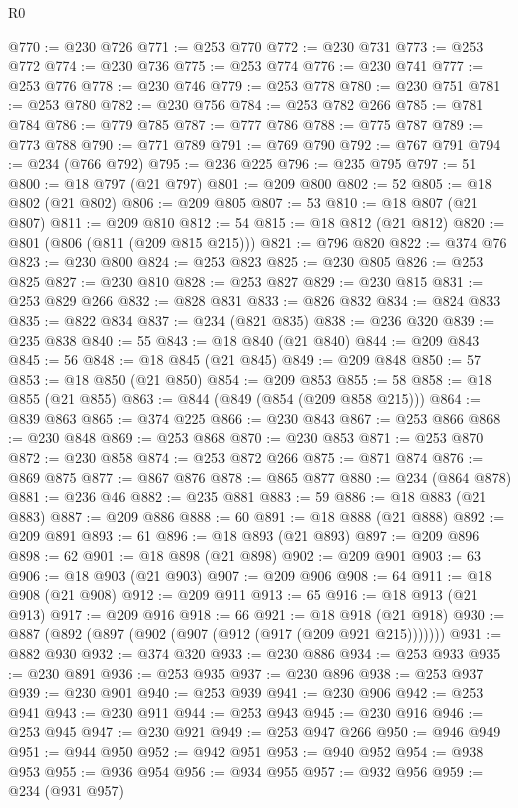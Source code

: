 \begin{lexlean}{R0}
\begin{coremodule}
@770 := @230 @726
@771 := @253 @770
@772 := @230 @731
@773 := @253 @772
@774 := @230 @736
@775 := @253 @774
@776 := @230 @741
@777 := @253 @776
@778 := @230 @746
@779 := @253 @778
@780 := @230 @751
@781 := @253 @780
@782 := @230 @756
@784 := @253 @782 @266
@785 := @781 @784
@786 := @779 @785
@787 := @777 @786
@788 := @775 @787
@789 := @773 @788
@790 := @771 @789
@791 := @769 @790
@792 := @767 @791
@794 := @234 (@766 @792)
@795 := @236 @225
@796 := @235 @795
@797 := 51
@800 := @18 @797 (@21 @797)
@801 := @209 @800
@802 := 52
@805 := @18 @802 (@21 @802)
@806 := @209 @805
@807 := 53
@810 := @18 @807 (@21 @807)
@811 := @209 @810
@812 := 54
@815 := @18 @812 (@21 @812)
@820 := @801 (@806 (@811 (@209 @815 @215)))
@821 := @796 @820
@822 := @374 @76
@823 := @230 @800
@824 := @253 @823
@825 := @230 @805
@826 := @253 @825
@827 := @230 @810
@828 := @253 @827
@829 := @230 @815
@831 := @253 @829 @266
@832 := @828 @831
@833 := @826 @832
@834 := @824 @833
@835 := @822 @834
@837 := @234 (@821 @835)
@838 := @236 @320
@839 := @235 @838
@840 := 55
@843 := @18 @840 (@21 @840)
@844 := @209 @843
@845 := 56
@848 := @18 @845 (@21 @845)
@849 := @209 @848
@850 := 57
@853 := @18 @850 (@21 @850)
@854 := @209 @853
@855 := 58
@858 := @18 @855 (@21 @855)
@863 := @844 (@849 (@854 (@209 @858 @215)))
@864 := @839 @863
@865 := @374 @225
@866 := @230 @843
@867 := @253 @866
@868 := @230 @848
@869 := @253 @868
@870 := @230 @853
@871 := @253 @870
@872 := @230 @858
@874 := @253 @872 @266
@875 := @871 @874
@876 := @869 @875
@877 := @867 @876
@878 := @865 @877
@880 := @234 (@864 @878)
@881 := @236 @46
@882 := @235 @881
@883 := 59
@886 := @18 @883 (@21 @883)
@887 := @209 @886
@888 := 60
@891 := @18 @888 (@21 @888)
@892 := @209 @891
@893 := 61
@896 := @18 @893 (@21 @893)
@897 := @209 @896
@898 := 62
@901 := @18 @898 (@21 @898)
@902 := @209 @901
@903 := 63
@906 := @18 @903 (@21 @903)
@907 := @209 @906
@908 := 64
@911 := @18 @908 (@21 @908)
@912 := @209 @911
@913 := 65
@916 := @18 @913 (@21 @913)
@917 := @209 @916
@918 := 66
@921 := @18 @918 (@21 @918)
@930 := @887 (@892 (@897 (@902 (@907 (@912 (@917 (@209 @921 @215)))))))
@931 := @882 @930
@932 := @374 @320
@933 := @230 @886
@934 := @253 @933
@935 := @230 @891
@936 := @253 @935
@937 := @230 @896
@938 := @253 @937
@939 := @230 @901
@940 := @253 @939
@941 := @230 @906
@942 := @253 @941
@943 := @230 @911
@944 := @253 @943
@945 := @230 @916
@946 := @253 @945
@947 := @230 @921
@949 := @253 @947 @266
@950 := @946 @949
@951 := @944 @950
@952 := @942 @951
@953 := @940 @952
@954 := @938 @953
@955 := @936 @954
@956 := @934 @955
@957 := @932 @956
@959 := @234 (@931 @957)

\end{coremodule}
\end{lexlean}
